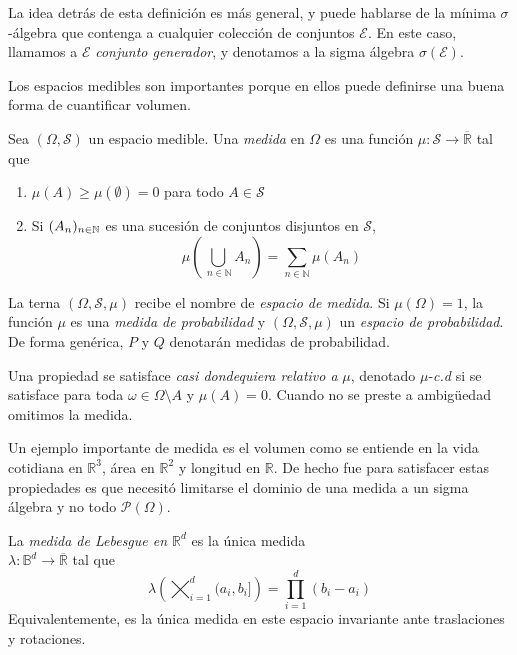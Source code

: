 \documentclass[main.tex]{subfiles}
\begin{document}
La idea detrás de esta definición es más general, y puede hablarse de la mínima $\sigma$-álgebra que contenga a cualquier colección de conjuntos $\mathcal{E}$. En este caso, llamamos a $\mathcal{E}$ \textit{conjunto generador}, y denotamos a la sigma álgebra $\sigma(\mathcal{E})$.

Los espacios medibles son importantes porque en ellos puede definirse una buena forma de cuantificar volumen.

\begin{definition}
Sea $(\Omega, \mathcal{S})$ un espacio medible. Una \textit{medida} en $\Omega$ es una función $\mu: \mathcal{S} \to \overline{\mathbb{R}}$ tal que
\begin{enumerate}[label=\roman*.]
	\item $\mu(A)\geq \mu(\emptyset)=0$ para todo $A\in\mathcal{S}$
	\item Si $(A_n)_{n\in\operatorname{\mathbb{N}}}$ es una sucesión de conjuntos disjuntos en $\mathcal{S}$, 
	\begin{equation*}
	\mu\left(\bigcup_{\ n\in\mathbb{N}}A_n\right)=
	\sum_{n\in\mathbb{N}}\mu(A_n)	
	\end{equation*}
\end{enumerate}
La terna $(\Omega, \mathcal{S}, \mu)$ recibe el nombre de \textit{espacio de medida}. Si $\mu(\Omega)=1$, la función $\mu$ es una \textit{medida de probabilidad} y $(\Omega, \mathcal{S}, \mu)$ un \textit{espacio de probabilidad}. De forma genérica, $P$ y $Q$ denotarán medidas de probabilidad.
\end{definition}

\begin{definition}
Una propiedad se satisface \textit{casi dondequiera relativo a} $\mu$, denotado $\mu$-\textit{c.d} si se satisface para toda $\omega\in \Omega\setminus A$ y $\mu(A)=0$. Cuando no se preste a ambigüedad  omitimos la medida.
\end{definition}

Un ejemplo importante de medida es el volumen como se entiende en la vida cotidiana en $\mathbb{R}^3$, área en $\mathbb{R}^2$ y longitud en $\mathbb{R}$. De hecho fue para satisfacer estas propiedades es que necesitó limitarse el dominio de una medida a un sigma álgebra y no todo $\mathcal{P}(\Omega)$. 

\begin{definition}
	La \textit{medida de Lebesgue en $\mathbb{R}^d$} es la única medida \\ $\lambda:\mathbb{B}^d\to\overline{\mathbb{R}}$ tal que
	\begin{equation*}
		\lambda\left(\bigtimes_{i=1}^d (a_i, b_i]\right)	= \prod_{i=1}^d(b_i-a_i)
	\end{equation*}
	Equivalentemente, es la única medida en este espacio invariante ante traslaciones y rotaciones. 
\end{definition}
\end{document}
